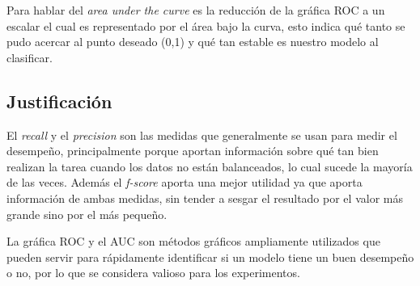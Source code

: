 \par Para hablar del \textit{area under the curve} es la reducción de la gráfica ROC a un escalar el cual es representado por el área bajo la curva, esto indica qué tanto se pudo acercar al punto deseado (0,1) y qué tan estable es nuestro modelo al clasificar.

\subsection{Justificación}

\par El \textit{recall} y el \textit{precision} son las medidas que generalmente se usan para medir el desempeño, principalmente porque aportan información sobre qué tan bien realizan la tarea cuando los datos no están balanceados, lo cual sucede la mayoría de las veces. Además el \textit{f-score} aporta una mejor utilidad ya que aporta información de ambas medidas, sin tender a sesgar el resultado por el valor más grande sino por el más pequeño.

\par La gráfica ROC y el AUC son métodos gráficos ampliamente utilizados que pueden servir para rápidamente identificar si un modelo tiene un buen desempeño o no, por lo que se considera valioso para los experimentos.


